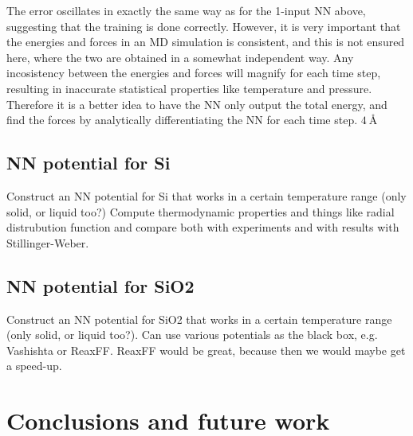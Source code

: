 \documentclass[twoside,english]{uiofysmaster}
\begin{document}
The error oscillates in exactly the same way as for the 1-input NN above, suggesting that the training is done correctly. 
However, it is very important that the energies and forces in an MD simulation is consistent, and this is not 
ensured here, where the two are obtained in a somewhat independent way. Any incosistency between the energies and forces
will magnify for each time step, resulting in inaccurate statistical properties like temperature and pressure. 
Therefore it is a better idea to have the NN only output the total energy, and find the forces by analytically
differentiating the NN for each time step. $\SI{4}{\angstrom}$


\chapter{NN potential for Si} \label{sec:SiPotentialResults}
Construct an NN potential for Si that works in a certain temperature range (only solid, or liquid too?)
Compute thermodynamic properties and things like radial distrubution function and compare both 
with experiments and with results with Stillinger-Weber. 

\chapter{NN potential for SiO2}
Construct an NN potential for SiO2 that works in a certain temperature range (only solid, or liquid too?). 
Can use various potentials as the black box, e.g. Vashishta or ReaxFF. 
ReaxFF would be great, because then we would maybe get a speed-up. 


\part{Conclusions and future work}
\end{document}
